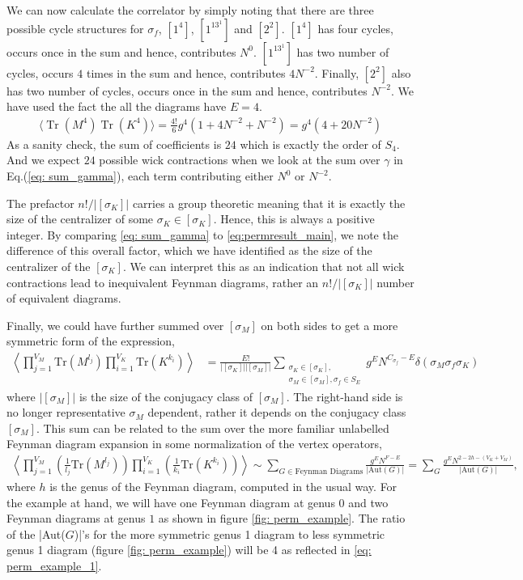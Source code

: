 \documentclass[english]{article}
\DeclareMathOperator{\Tr}{Tr}
\newcommand{\inv}{\frac{1}}
\renewcommand{\>}{\rangle}
\newcommand{\<}{\langle}
\renewcommand{\(}{\left(}
\renewcommand{\)}{\right)}
\begin{document}
We can now calculate the correlator by simply noting that there are three possible cycle structures for $\sigma_f$, $[1^4]$, $[1^13^1]$ and $[2^2]$. $[1^4]$ has four cycles, occurs once in the sum and hence, contributes $N^0$. $[1^13^1]$ has two number of cycles, occurs $4$ times in the sum and hence, contributes $4N^{-2}$. Finally, $[2^2]$  also has two number of cycles, occurs once in the sum and hence, contributes $N^{-2}$. We have used the fact the all the diagrams have $E=4$.
\begin{align}\label{eq: perm_example_1}
    \langle \Tr(M^4)\Tr(K^4)\rangle=\frac{4!}{6}g^4(1+4N^{-2}+N^{-2})=g^4(4+20N^{-2})
\end{align}
As a sanity check, the sum of coefficients is $24$ which is exactly the order of $S_4$. And we expect $24$ possible wick contractions when we look at the sum over $\gamma$ in Eq.(\ref{eq: sum_gamma}), each term contributing either $N^0$ or $N^{-2}$.

The prefactor $n!/|[\sigma_K]|$ carries a group theoretic meaning that it is exactly the size of the centralizer of some $\sigma_K\in [\sigma_K]$. Hence, this is always a positive integer. By comparing \eqref{eq: sum_gamma} to \eqref{eq:permresult_main}, we note the difference of this overall factor, which we have identified as the size of the centralizer of the $[\sigma_K]$. We can interpret this as an indication that not all wick contractions lead to inequivalent Feynman diagrams, rather an $n!/|[\sigma_K]|$ number of equivalent diagrams.


Finally, we could have further summed over $[\sigma_M]$ on both sides to get a more symmetric form of the expression, 
\begin{align}
     \left\langle \prod_{j=1}^{V_M}\text{Tr}(M^{l_j})\prod_{i=1}^{V_K}\text{Tr}(K^{k_i})\right\rangle&=\frac{E!}{|[\sigma_K]||[\sigma_M]|}\sum_{\substack{\sigma_K\in [\sigma_K],\\\sigma_{M}\in [\sigma_{M}],\sigma_f\in S_E}}g^EN^{C_{\sigma_f}-E}\delta(\sigma_M\sigma_f\sigma_K)
\end{align}
where $|[\sigma_{M}]|$ is the size of the conjugacy class of $[\sigma_{M}]$. The right-hand side is no longer representative $\sigma_{M}$ dependent, rather it depends on the conjugacy class $[\sigma_{M}]$. This sum can be related to the sum over the more familiar unlabelled Feynman diagram expansion in some normalization of the vertex operators, 
\begin{align}
\left\langle \prod_{j=1}^{V_M}\left(\inv{l_j} \text{Tr}(M^{l_j})\right)\prod_{i=1}^{V_K}\left(\inv{k_i}\text{Tr}(K^{k_i})\right)\right\rangle \sim \sum_{G\in \text{Feynman Diagrams}}\frac{g^E N^{F-E}}{|\text{Aut}(G)|}= \sum_{G}\frac{g^EN^{2-2h-(V_K + V_M)}}{|\text{Aut}(G)|},
\end{align}
where $h$ is the genus of the Feynman diagram, computed in the usual way. For the example at hand, we will have one Feynman diagram at genus $0$ and two Feynman diagrams at genus $1$ as shown in figure \ref{fig: perm_example}. The ratio of the |Aut($G$)|'s for the more symmetric genus 1 diagram to less symmetric genus 1 diagram (figure \ref{fig: perm_example}) will be 4 as reflected in \eqref{eq: perm_example_1}. 
\end{document}
